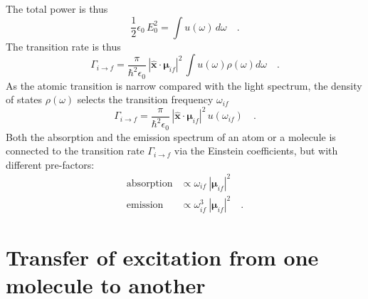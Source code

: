 The total power is thus
\begin{equation}
 \frac{1}{2} \epsilon_0  \, E_0^2  = \int  u(\omega)  \, d\omega \quad .
\end{equation}
The  transition rate is thus 
\begin{equation}
 \Gamma_{i \rightarrow f} =   \frac{\pi  }{\hbar^2 \epsilon_0}  \, |\mathbf{\hat{x}} \cdot \mathbf{\mu}_{if} |^2 \,
\int u(\omega)  
  \rho(\omega)  d \omega \quad .
\end{equation}
As the atomic transition is narrow compared with the light spectrum, the density of states $\rho(\omega)$ selects the transition frequency $\omega_{if}$ 
\begin{equation}
 \Gamma_{i \rightarrow f} =   \frac{\pi  }{\hbar^2 \epsilon_0}  \, |\mathbf{\hat{x}} \cdot \mathbf{\mu}_{if} |^2 \,
 u(\omega_{if})   \quad .
\end{equation}
Both the absorption and the emission spectrum of an atom or a molecule is connected to the transition rate $\Gamma_{i \rightarrow f}$ via the Einstein coefficients, but with different pre-factors:
\begin{align}
   \text{absorption} & \propto \omega_{if} \  |\mathbf{\mu}_{if} |^2 \\
   \text{emission} & \propto \omega_{if}^3 \  |\mathbf{\mu}_{if} |^2  \quad .
\end{align}



\section{Transfer of excitation from one molecule to another}

